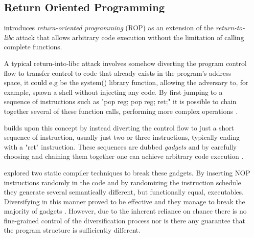 \subsection{Return Oriented Programming}
\label{rop}

\textcite{rop} introduces \textit{return-oriented programming} (ROP) as an extension of
the \textit{return-to-libc}\cite{return-into-libc} attack that allows arbitrary code
execution without the limitation of calling complete functions.

A typical return-into-libc attack involves somehow diverting the program control
flow to transfer control to code that already exists in the program's address space,
it could e.g be the system() library function, allowing the adversary to, for example, spawn
a shell without injecting any code. By first jumping to a sequence of instructions such as
"pop reg; pop reg; ret;" it is possible to chain together several of these function calls,
performing more complex operations \cite{non-exec-stack,advanced-return-into-libc}.

\textcite{rop} builds upon this concept by instead diverting the control flow to just a short
sequence of instruction, usually just two or three instructions, typically ending with a
"ret" instruction. These sequences are dubbed \textit{gadgets} and by carefully choosing
and chaining them together one can achieve arbitrary code execution \cite{rop}.

\textcite{large-scale-automated} explored two static compiler techniques to break these
gadgets. By inserting NOP instructions randomly in the code and by randomizing the
instruction schedule they generate several semantically different, but functionally equal,
executables. Diversifying in this manner proved to be effective and they manage to break
the majority of gadgets \cite{large-scale-automated}. However, due to the inherent reliance
on chance there is no fine-grained control of the diversification process nor is there
any guarantee that the program structure is sufficiently different.
